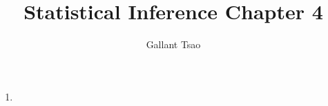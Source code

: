 \documentclass{article}
\title{Statistical Inference Chapter 4}
\author{Gallant Tsao}
\begin{document}
\maketitle

\begin{enumerate}
    \item
\end{enumerate}
\end{document}
